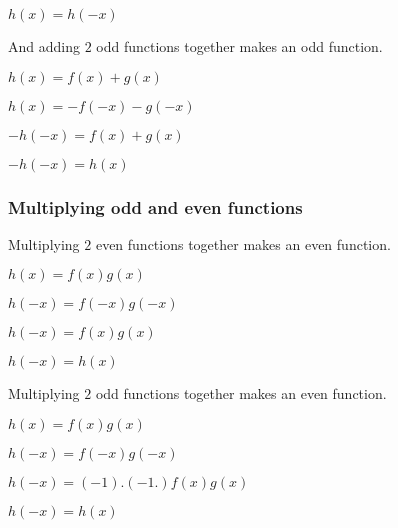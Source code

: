 \(h(x)=h(-x)\)

And adding \(2\) odd functions together makes an odd function.

\(h(x)=f(x)+g(x)\)

\(h(x)=-f(-x)-g(-x)\)

\(-h(-x)=f(x)+g(x)\)

\(-h(-x)=h(x)\)

\subsubsection{Multiplying odd and even functions}

Multiplying \(2\) even functions together makes an even function.

\(h(x)=f(x)g(x)\)

\(h(-x)=f(-x)g(-x)\)

\(h(-x)=f(x)g(x)\)

\(h(-x)=h(x)\)

Multiplying \(2\) odd functions together makes an even function.

\(h(x)=f(x)g(x)\)

\(h(-x)=f(-x)g(-x)\)

\(h(-x)=(-1).(-1.)f(x)g(x)\)

\(h(-x)=h(x)\)

